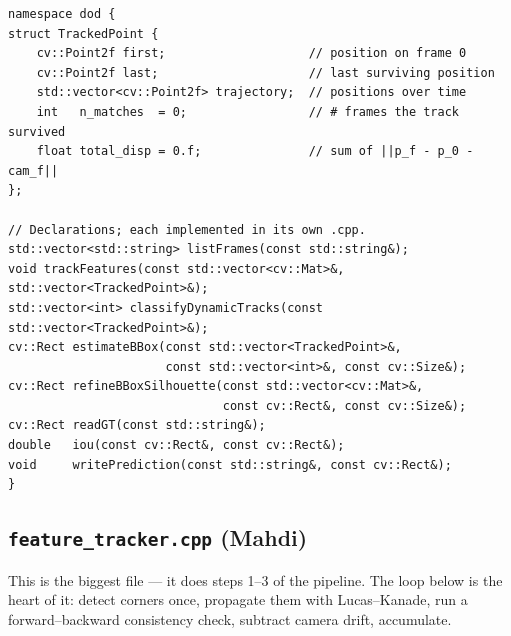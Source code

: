 \documentclass[11pt,a4paper]{article}
\begin{document}
\begin{lstlisting}[caption={\texttt{include/dod.hpp} (Riccardo Pesce).}]
namespace dod {
struct TrackedPoint {
    cv::Point2f first;                    // position on frame 0
    cv::Point2f last;                     // last surviving position
    std::vector<cv::Point2f> trajectory;  // positions over time
    int   n_matches  = 0;                 // # frames the track survived
    float total_disp = 0.f;               // sum of ||p_f - p_0 - cam_f||
};

// Declarations; each implemented in its own .cpp.
std::vector<std::string> listFrames(const std::string&);
void trackFeatures(const std::vector<cv::Mat>&, std::vector<TrackedPoint>&);
std::vector<int> classifyDynamicTracks(const std::vector<TrackedPoint>&);
cv::Rect estimateBBox(const std::vector<TrackedPoint>&,
                      const std::vector<int>&, const cv::Size&);
cv::Rect refineBBoxSilhouette(const std::vector<cv::Mat>&,
                              const cv::Rect&, const cv::Size&);
cv::Rect readGT(const std::string&);
double   iou(const cv::Rect&, const cv::Rect&);
void     writePrediction(const std::string&, const cv::Rect&);
}
\end{lstlisting}

\subsection{\texttt{feature\_tracker.cpp} (Mahdi)}

This is the biggest file --- it does steps 1--3 of the pipeline.
The loop below is the heart of it: detect corners once, propagate
them with Lucas--Kanade, run a forward--backward consistency check,
subtract camera drift, accumulate.
\end{document}
